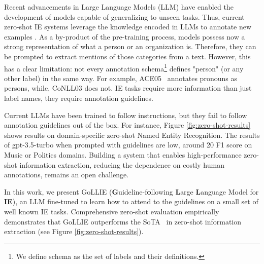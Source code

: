 Recent advancements in Large Language Models (LLM) \citep{10.1145/3605943} have enabled the development of models capable of generalizing to unseen tasks. Thus, current zero-shot IE systems leverage the knowledge encoded in LLMs to annotate new examples \citep{sainz-etal-2022-textual,DBLP:journals/corr/abs-2304-08085}. As a by-product of the pre-training process, models possess now a strong representation of what a person or an organization is. Therefore, they can be prompted to extract mentions of those categories from a text. However, this has a clear limitation: not every annotation schema\footnote{We define schema as the set of labels and their definitions.} defines "person" (or any other label) in the same way. For example, ACE05~\citep{ACE} annotates pronouns as persons, while, CoNLL03 \citep{tjong-kim-sang-de-meulder-2003-introduction} does not. IE tasks require more information than just label names, they require annotation guidelines. 

Current LLMs have been trained to follow instructions, but they fail to follow annotation guidelines out of the box. 
For instance, Figure \ref{fig:zero-shot-results} shows results on domain-specific zero-shot Named Entity Recognition. The results of gpt-3.5-turbo when prompted with guidelines  \citep{DBLP:journals/corr/abs-2305-12217} are low, around 20 F1 score on Music or Politics domains. Building a system that enables high-performance zero-shot information extraction, reducing the dependence on costly human annotations, remains an open challenge.  

In this work, we present \GoLLIE GoLLIE  (\textbf{G}uideline-f\textbf{o}llowing \textbf{L}arge \textbf{L}anguage Model for \textbf{IE}), an LLM fine-tuned to learn how to attend to the guidelines on a small set of well known IE tasks. Comprehensive zero-shot evaluation empirically demonstrates that GoLLIE outperforms the SoTA~\citep{DBLP:journals/corr/abs-2304-08085}  in zero-shot information extraction (see Figure \ref{fig:zero-shot-results}). 

